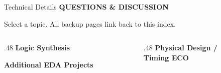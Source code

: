 \documentclass[aspectratio=169,10pt]{beamer}
\newcommand{\smalllabel}[1]{{\scriptsize\bfseries\color{Accent}\MakeUppercase{#1}}}
\newcommand{\slidenavigation}{}
\newcommand{\slideposition}{}
\newcommand{\slidesubtitle}[1]{%
  \smalllabel{#1}%
}
\begin{document}
\appendix
\renewcommand{\slidenavigation}{\hyperlink{summary-4}{\beamerreturnbutton{Back to project overview}}}
\renewcommand{\slideposition}{Details index}
\begin{frame}[label=details-index]{Technical Details}
  \slidesubtitle{Questions \& Discussion}\par\vspace{.18cm}
  {\small Select a topic. All backup pages link back to this index.}\par
  \vspace{.45cm}
  \begin{columns}[T,onlytextwidth]
    \begin{column}{.48\textwidth}
      {\normalsize\bfseries\color{Accent}Logic Synthesis}\par\vspace{.30cm}
      \hyperlink{detail-dc-abc}{}\par\vspace{.30cm}
      \hyperlink{detail-legality}{}\par\vspace{.35cm}
      {\normalsize\bfseries\color{Accent}Additional EDA Projects}\par\vspace{.22cm}
      \hyperlink{detail-mini-soc}{}\par\vspace{.22cm}
      \hyperlink{detail-diffusion-floorplan}{}
    \end{column}
    \begin{column}{.48\textwidth}
      {\normalsize\bfseries\color{Accent}Physical Design /\\Timing ECO}\par\vspace{.30cm}
      \hyperlink{detail-pd-flow}{}\par\vspace{.30cm}
      \hyperlink{detail-quality}{}\par\vspace{.30cm}
      \hyperlink{detail-parallel}{}
    \end{column}
  \end{columns}
\end{frame}
\end{document}
